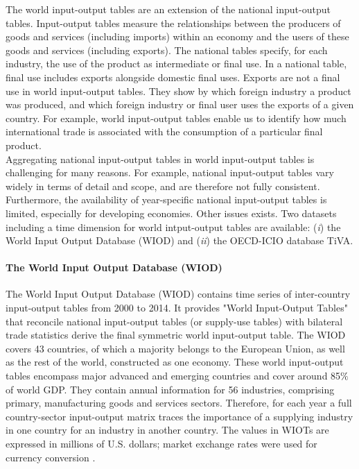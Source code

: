 \documentclass[11pt,a4paper]{article}
\begin{document}
The world input-output tables are an extension of the national input-output tables. Input-output tables measure the relationships between the producers of goods and services (including imports) within an economy and the users of these goods and services (including exports). The national tables specify, for each industry, the use of the product as intermediate or final use. In a national table, final use includes exports alongside domestic final uses. Exports are not a final use in world input-output tables. They show by which foreign industry a product was produced, and which foreign industry or final user uses the exports of a given country. For example, world input-output tables enable us to identify how much international trade is associated with the consumption of a particular final product. \\
Aggregating national input-output tables in world input-output tables is challenging for many reasons. For example, national input-output tables vary widely in terms of detail and scope, and are therefore not fully consistent. Furthermore, the availability of year-specific national input-output tables is limited, especially for developing economies. Other issues exists.
Two datasets including a time dimension for world intput-output tables are available: (\textit{i}) the World Input Output Database (WIOD) and (\textit{ii}) the OECD-ICIO database TiVA.
\paragraph{The World Input Output Database (WIOD)}
The World Input Output Database (WIOD) contains time series of inter-country input-output tables from 2000 to 2014.  It provides "World Input-Output Tables" that reconcile national input-output tables (or supply-use tables) with bilateral trade statistics derive the final symmetric world input-output table. The WIOD covers 43 countries, of which a majority belongs to the European Union, as well as the rest of the world, constructed as one economy. 
These world input-output tables encompass major advanced and emerging countries and cover around 85$\%$ of world GDP. They contain annual information for 56 industries, comprising primary, manufacturing goods and services sectors. Therefore, for each year a full country-sector input-output matrix traces the importance of a supplying industry in one country for an industry in another country. The values in WIOTs are expressed in millions of U.S. dollars; market exchange rates were used for currency conversion \citep{TimmerIllustratedUserGuide2015}. %
\end{document}
